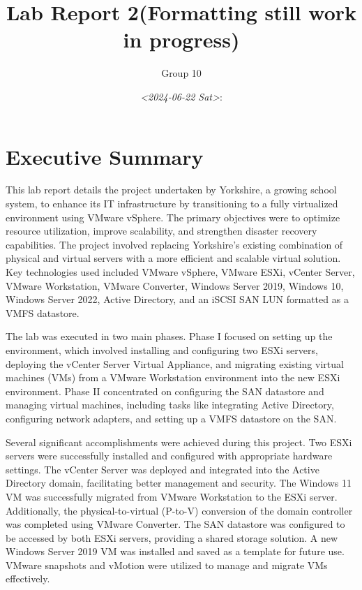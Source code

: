 \documentclass[letterpaper,12pt]{article}
\author{Group 10}
\date{\textit{<2024-06-22 Sat>}:}
\title{Lab Report 2(Formatting still work in progress)}
\begin{document}
\maketitle
\tableofcontents

\newpage
\setcounter{tocdepth}{2}
\tableofcontents

\section{Executive Summary}
\label{sec:orga97abed}
This lab report details the project undertaken by Yorkshire, a growing school system, to enhance its IT infrastructure by transitioning to a fully virtualized environment using VMware vSphere. The primary objectives were to optimize resource utilization, improve scalability, and strengthen disaster recovery capabilities. The project involved replacing Yorkshire's existing combination of physical and virtual servers with a more efficient and scalable virtual solution. Key technologies used included VMware vSphere, VMware ESXi, vCenter Server, VMware Workstation, VMware Converter, Windows Server 2019, Windows 10, Windows Server 2022, Active Directory, and an iSCSI SAN LUN formatted as a VMFS datastore.

The lab was executed in two main phases. Phase I focused on setting up the environment, which involved installing and configuring two ESXi servers, deploying the vCenter Server Virtual Appliance, and migrating existing virtual machines (VMs) from a VMware Workstation environment into the new ESXi environment. Phase II concentrated on configuring the SAN datastore and managing virtual machines, including tasks like integrating Active Directory, configuring network adapters, and setting up a VMFS datastore on the SAN.

Several significant accomplishments were achieved during this project. Two ESXi servers were successfully installed and configured with appropriate hardware settings. The vCenter Server was deployed and integrated into the Active Directory domain, facilitating better management and security. The Windows 11 VM was successfully migrated from VMware Workstation to the ESXi server. Additionally, the physical-to-virtual (P-to-V) conversion of the domain controller was completed using VMware Converter. The SAN datastore was configured to be accessed by both ESXi servers, providing a shared storage solution. A new Windows Server 2019 VM was installed and saved as a template for future use. VMware snapshots and vMotion were utilized to manage and migrate VMs effectively.
\end{document}
